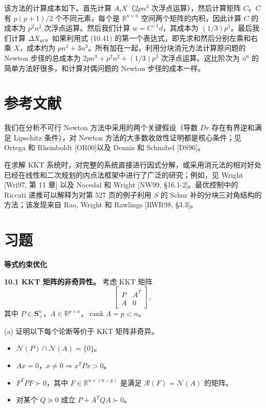 \documentclass[UTF8, 12pt, fontset=fandol, oneside]{ctexart}
\begin{document}
该方法的计算成本如下。首先计算 $A_iX$（$2pn^3$ 次浮点运算），然后计算矩阵 $C$。$C$ 有 $p(p+1)/2$ 个不同元素，每个是 $\mathbb{R}^{n\times n}$ 空间两个矩阵的内积，因此计算 $C$ 的成本为 $p^2n^2$ 次浮点运算。然后我们计算 $w=C^{-1}d$，其成本为 $(1/3)p^3$。最后我们计算 $\Delta X_{\mathrm{nt}}$。如果利用式 (10.41) 的第一个表达式，即先求和然后分别左乘和右乘 $X$，成本约为 $pn^2+3n^3$。所有加在一起，利用分块消元方法计算原问题的 Newton 步径的总成本为 $2pn^3+p^2n^2+(1/3)p^3$ 次浮点运算。这比阶次为 $n^6$ 的简单方法好很多，和计算对偶问题的 Newton 步径的成本一样。

\section*{参考文献}

我们在分析不可行 Newton 方法中采用的两个关键假设（导数 $Dr$ 存在有界逆和满足 Lipschitz 条件），对 Newton 方法的大多数收敛性证明都是核心条件；见 Ortega 和 Rheinboldt [OR00]以及 Dennis 和 Schnabel [DS96]。

在求解 KKT 系统时，对完整的系统直接进行因式分解，或采用消元法的相对好处已经在线性和二次规划的内点法框架中进行了广泛的研究；例如，见 Wright [Wri97, 第 11 章] 以及 Nocedal 和 Wright [NW99, \S16.1-2]。最优控制中的 Riccati 递推可以解释为对第 527 页的例子利用 $S$ 的 Schur 补的分块三对角结构的方法；该发现来自 Rao, Wright 和 Rawlings [RWR98, \S3.3]。

\section*{习题}

\noindent\textbf{等式约束优化}

\noindent\textbf{10.1 KKT 矩阵的非奇异性。}\quad
考虑 KKT 矩阵
\[
\begin{bmatrix}
P&A^T\\
A&0
\end{bmatrix},
\]
其中 $P\in\mathbf{S}_+^n$，$A\in\mathbb{R}^{p\times n}$，$\operatorname{rank}A=p<n$。

(a) 证明以下每个论断等价于 KKT 矩阵非奇异。
\begin{itemize}
\item $\mathcal{N}(P)\cap\mathcal{N}(A)=\{0\}$。
\item $Ax=0$，$x\neq0\Longrightarrow x^TPx>0$。
\item $F^TPF\succ0$，其中 $F\in\mathbb{R}^{n\times(n-p)}$ 是满足 $\mathcal{R}(F)=\mathcal{N}(A)$ 的矩阵。
\item 对某个 $Q\succeq0$ 成立 $P+A^TQA\succ0$。
\end{itemize}
\end{document}
